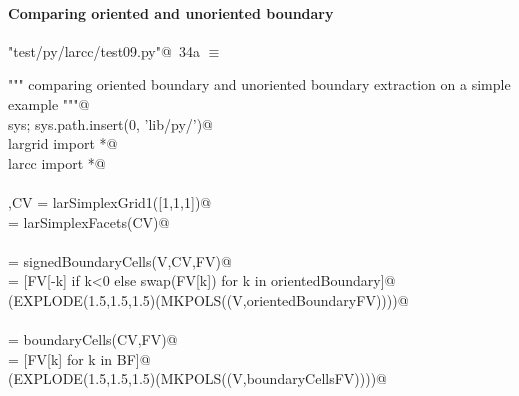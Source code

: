 \documentclass[11pt,oneside]{article}	%
\begin{document}

\paragraph{Comparing oriented and unoriented boundary}

\begin{flushleft} \small \label{scrap58}
\protect{}\verb@"test/py/larcc/test09.py"@\nobreak\ {\footnotesize 34a }$\equiv$
\vspace{-1ex}
\begin{list}{}{} \item
\mbox{}\verb@""" comparing oriented boundary and unoriented boundary extraction on a simple example """@\\
\mbox{}\verb@import sys; sys.path.insert(0, 'lib/py/')@\\
\mbox{}\verb@from largrid import *@\\
\mbox{}\verb@from larcc import *@\\
\mbox{}\verb@@\\
\mbox{}\verb@V,CV = larSimplexGrid1([1,1,1])@\\
\mbox{}\verb@FV = larSimplexFacets(CV)@\\
\mbox{}\verb@@\\
\mbox{}\verb@orientedBoundary = signedBoundaryCells(V,CV,FV)@\\
\mbox{}\verb@orientedBoundaryFV = [FV[-k] if k<0 else swap(FV[k]) for k in orientedBoundary]@\\
\mbox{}\verb@VIEW(EXPLODE(1.5,1.5,1.5)(MKPOLS((V,orientedBoundaryFV))))@\\
\mbox{}\verb@@\\
\mbox{}\verb@BF = boundaryCells(CV,FV)@\\
\mbox{}\verb@boundaryCellsFV = [FV[k] for k in BF]@\\
\mbox{}\verb@VIEW(EXPLODE(1.5,1.5,1.5)(MKPOLS((V,boundaryCellsFV))))@\\
\mbox{}\verb@@{\NWsep}
\end{list}
\vspace{-2ex}
\end{flushleft}
\end{document}
